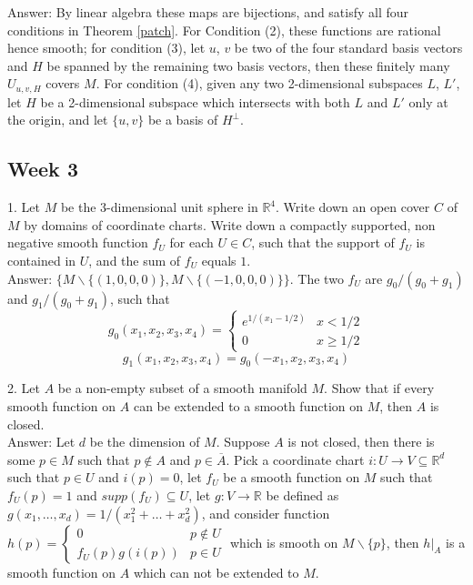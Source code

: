 \documentclass{article}
\theoremstyle{definition}
\begin{document}
Answer: By linear algebra these maps are bijections, and satisfy all four conditions in Theorem \ref{patch}. For Condition (2), these functions are rational hence smooth; for condition (3), let $u$, $v$ be two of the four standard basis vectors and $H$ be spanned by the remaining two basis vectors, then these finitely many $U_{u, v, H}$ covers $M$. For condition (4), given any two 2-dimensional subspaces $L$, $L'$, let $H$ be a 2-dimensional subspace which intersects with both $L$ and $L'$ only at the origin, and let $\{u, v\}$ be a basis of $H^\perp$.

\subsection{Week 3}

1. Let $M$ be the 3-dimensional unit sphere in $\mathbb{R}^4$. Write down an open cover $C$ of $M$ by domains of coordinate charts. Write down a compactly supported, non negative smooth function $f_U$ for each $U\in C$, such that the support of $f_U$ is contained in $U$, and the sum of $f_U$ equals $1$.\\

Answer: $\{M\backslash \{(1, 0, 0, 0)\}, M\backslash \{(-1, 0, 0, 0)\}\}$. The two $f_U$ are $g_0/(g_0+g_1)$ and $g_1/(g_0+g_1)$, such that
\[g_0(x_1, x_2, x_3, x_4)=\begin{cases}e^{1/(x_1-1/2)} & x<1/2\\ 0 & x\geq 1/2\end{cases}\]
\[g_1(x_1, x_2, x_3, x_4)=g_0(-x_1, x_2, x_3, x_4)\]

2. Let $A$ be a non-empty subset of a smooth manifold $M$. Show that if every smooth function on $A$ can be extended to a smooth function on $M$, then $A$ is closed.\\

Answer: Let $d$ be the dimension of $M$. Suppose $A$ is not closed, then there is some $p\in M$ such that $p\not\in A$ and $p\in\overline{A}$. Pick a coordinate chart $i: U\rightarrow V\subseteq\mathbb{R}^d$ such that $p\in U$ and $i(p)=0$, let $f_U$ be a smooth function on $M$ such that $f_U(p)=1$ and $supp(f_U)\subseteq U$, let $g:V\rightarrow \mathbb{R}$ be defined as $g(x_1, \dots, x_d)=1/(x_1^2+\dots+x_d^2)$, and consider function $h(p)=\begin{cases}0 & p\not\in U\\ f_U(p)g(i(p)) & p\in U\end{cases}$ which is smooth on $M\backslash \{p\}$, then $h|_A$ is a smooth function on $A$ which can not be extended to $M$.
\end{document}
